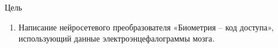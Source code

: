 \begin{frame}{Цель}
	\begin{enumerate}
		\item Написание нейросетевого преобразователя «Биометрия – код доступа»,
			использующий данные электроэнцефалограммы мозга.
	\end{enumerate}
\end{frame}
